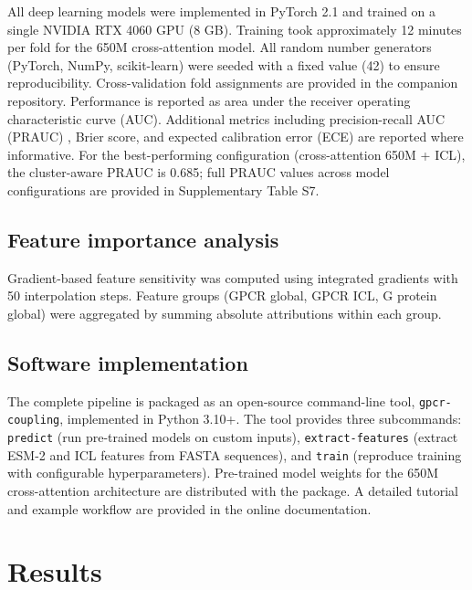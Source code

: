 \documentclass[11pt,a4paper]{article}
\begin{document}
All deep learning models were implemented in PyTorch 2.1 \cite{paszke2019pytorch} and trained on a single NVIDIA RTX 4060 GPU (8 GB). Training took approximately 12 minutes per fold for the 650M cross-attention model. All random number generators (PyTorch, NumPy, scikit-learn) were seeded with a fixed value (42) to ensure reproducibility. Cross-validation fold assignments are provided in the companion repository. Performance is reported as area under the receiver operating characteristic curve (AUC). Additional metrics including precision-recall AUC (PRAUC) \cite{davis2006calibration, saito2015prauc}, Brier score, and expected calibration error (ECE) are reported where informative. For the best-performing configuration (cross-attention 650M + ICL), the cluster-aware PRAUC is 0.685; full PRAUC values across model configurations are provided in Supplementary Table S7.

\subsection{Feature importance analysis}

Gradient-based feature sensitivity was computed using integrated gradients \cite{sundararajan2017axiomatic} with 50 interpolation steps. Feature groups (GPCR global, GPCR ICL, G protein global) were aggregated by summing absolute attributions within each group.

\subsection{Software implementation}

The complete pipeline is packaged as an open-source command-line tool, \texttt{gpcr-coupling}, implemented in Python 3.10+. The tool provides three subcommands: \texttt{predict} (run pre-trained models on custom inputs), \texttt{extract-features} (extract ESM-2 and ICL features from FASTA sequences), and \texttt{train} (reproduce training with configurable hyperparameters). Pre-trained model weights for the 650M cross-attention architecture are distributed with the package. A detailed tutorial and example workflow are provided in the online documentation.

\section{Results}
\end{document}
